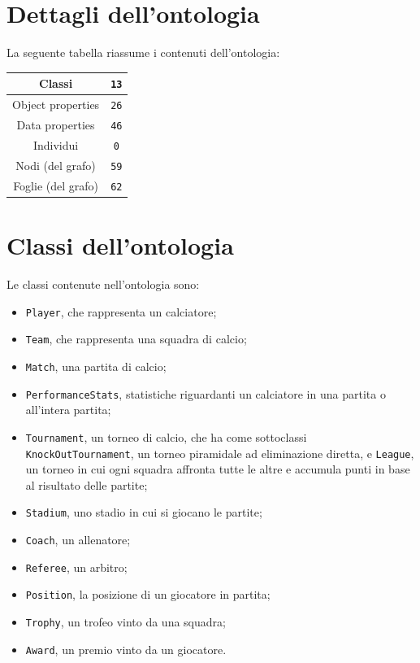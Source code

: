 \documentclass[11pt]{report} %
\begin{document}
\section{Dettagli dell'ontologia}

La seguente tabella riassume i contenuti dell'ontologia:

\begin{center}
    \begin{tabular}{||c|c||}
        \hline
        Classi & \texttt{13} \\
        \hline
        Object properties & \texttt{26} \\
        \hline
        Data properties & \texttt{46} \\
        \hline
        Individui & \texttt{0} \\
        \hline
        Nodi (del grafo) & \texttt{59} \\
        \hline
        Foglie (del grafo) & \texttt{62} \\
        \hline
    \end{tabular}
\end{center}

\section{Classi dell'ontologia}

Le classi contenute nell'ontologia sono:

\begin{itemize}
    \item \texttt{Player}, che rappresenta un calciatore;
    \item \texttt{Team}, che rappresenta una squadra di calcio;
    \item \texttt{Match}, una partita di calcio;
    \item \texttt{PerformanceStats}, statistiche riguardanti un calciatore in una partita o all'intera partita;
    \item \texttt{Tournament}, un torneo di calcio, che ha come sottoclassi \texttt{KnockOutTournament}, un torneo piramidale ad eliminazione diretta, e \texttt{League}, un torneo in cui ogni squadra affronta tutte le altre e accumula punti in base al risultato delle partite;
    \item \texttt{Stadium}, uno stadio in cui si giocano le partite;
    \item \texttt{Coach}, un allenatore;
    \item \texttt{Referee}, un arbitro;
    \item \texttt{Position}, la posizione di un giocatore in partita;
    \item \texttt{Trophy}, un trofeo vinto da una squadra;
    \item \texttt{Award}, un premio vinto da un giocatore.
\end{itemize}
\end{document}
